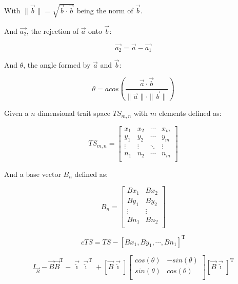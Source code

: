 \documentclass[a4paper,11pt]{article}
\begin{document}
With $\|\vec{b}\| = \sqrt{\vec{b} \cdot \vec{b}}$ being the norm of $\vec{b}$.

 And $\vec{a_{2}}$, the rejection of $\vec{a}$ onto $\vec{b}$:

\begin{equation}
    \vec{a_{2}} = \vec{a} - \vec{a_{1}}
\end{equation}

And $\theta$, the angle formed by $\vec{a}$ and $\vec{b}$:

\begin{equation}
    \theta = acos \left(\frac{\vec{a} \cdot \vec{b}}{\|\vec{a}\| \cdot \|\vec{b}\|} \right)
\end{equation}


Given a $n$ dimensional trait space $TS_{m,n}$ with $m$ elements defined as:

\begin{equation*}
TS_{m,n} = 
    \begin{bmatrix}
        x_{1} & x_{2} & \cdots & x_{m} \\
        y_{1} & y_{2} & \cdots & y_{m} \\
        \vdots  & \vdots  & \ddots & \vdots  \\
        n_{1} & n_{2} & \cdots & n_{m} \\
    \end{bmatrix}
\end{equation*}


And a base vector $B_{n}$ defined as:

\begin{equation*}
B_{n} = 
    \begin{bmatrix}
        Bx_{1} & Bx_{2}\\
        By_{1} & By_{2}\\
        \vdots  & \vdots \\
        Bn_{1} & Bn_{2}\\
    \end{bmatrix}
\end{equation*}


\begin{equation}
        cTS = TS - [Bx_{1}, By_{1}, \cdots, Bn_{1}]^{\text{T}}
\end{equation}



\begin{equation}
I_{\vec{B}} - \vec{B}\vec{B}^\text{T} - \vec{\hat{\imath}}\vec{\hat{\imath}}^\text{T} + [\vec{B} \vec{\hat{\imath}}]     \begin{bmatrix}
        cos(\theta) & -sin(\theta)\\
        sin(\theta) & cos(\theta)\\
    \end{bmatrix} [\vec{B} \vec{\hat{\imath}}]^\text{T}
\end{equation}
\end{document}
